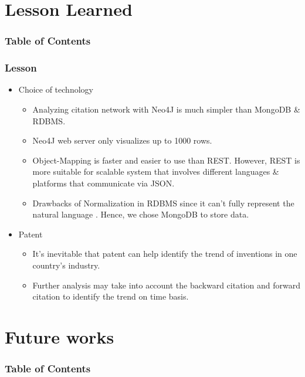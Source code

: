 \documentclass{beamer}
\begin{document}
\section{Lesson Learned}
\begin{frame}
\frametitle{Table of Contents}
\tableofcontents[currentsection]
\end{frame}

\begin{frame}
\frametitle{Lesson}
\begin{itemize}
\item Choice of technology
	\begin{itemize}
	\item Analyzing citation network with Neo4J is much simpler than MongoDB \& RDBMS.
	\item Neo4J web server only visualizes up to 1000 rows.
	\item Object-Mapping is faster and easier to use than REST. However, REST is more suitable for scalable system that involves different languages \& platforms that communicate via JSON. 
	\item Drawbacks of Normalization in RDBMS since it can't fully represent the natural language . Hence, we chose MongoDB to store data.
	\end{itemize}
\item Patent
	\begin{itemize}
		\item It's inevitable that patent can help identify the trend of inventions in one country's industry.
		\item Further analysis may take into account the backward citation and forward citation to identify the trend on time basis.
	\end{itemize}
\end{itemize}
\end{frame}
\section{Future works}
\begin{frame}
\frametitle{Table of Contents}
\tableofcontents[currentsection]
\end{frame}
\end{document}

